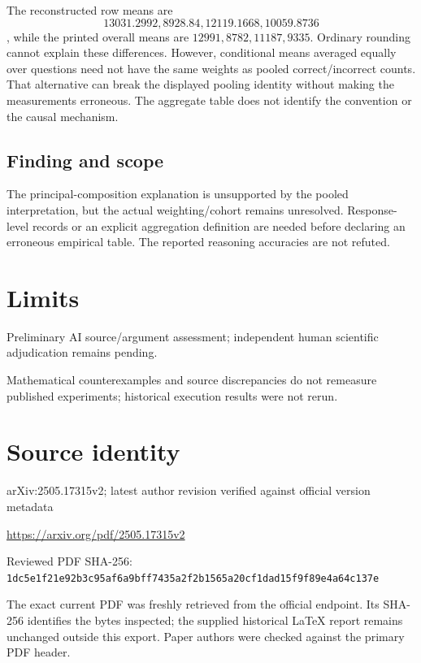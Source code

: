 \documentclass[11pt]{article}
\begin{document}
The reconstructed row means are \[13031.2992,8928.84,12119.1668,10059.8736\], while the printed overall means are \(12991,8782,11187,9335\). Ordinary rounding cannot explain these differences. However, conditional means averaged equally over questions need not have the same weights as pooled correct/incorrect counts. That alternative can break the displayed pooling identity without making the measurements erroneous. The aggregate table does not identify the convention or the causal mechanism.

\subsection*{Finding and scope}

The principal-composition explanation is unsupported by the pooled interpretation, but the actual weighting/cohort remains unresolved. Response-level records or an explicit aggregation definition are needed before declaring an erroneous empirical table. The reported reasoning accuracies are not refuted.

\section*{Limits}

Preliminary AI source/argument assessment; independent human scientific adjudication remains pending.\par

Mathematical counterexamples and source discrepancies do not remeasure published experiments; historical execution results were not rerun.\par

\section*{Source identity}

arXiv:2505.17315v2; latest author revision verified against official version metadata

\url{https://arxiv.org/pdf/2505.17315v2}

Reviewed PDF SHA-256: \nolinkurl{1dc5e1f21e92b3c95af6a9bff7435a2f2b1565a20cf1dad15f9f89e4a64c137e}

The exact current PDF was freshly retrieved from the official endpoint. Its SHA-256 identifies the bytes inspected; the supplied historical LaTeX report remains unchanged outside this export. Paper authors were checked against the primary PDF header.
\end{document}
